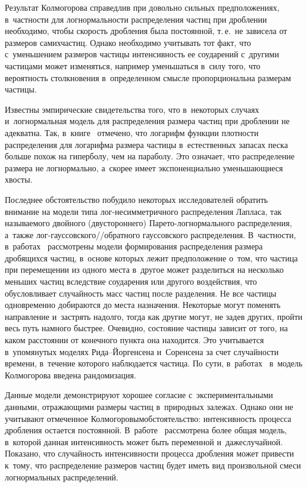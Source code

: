 \begin{multicols}{2}
 Результат Колмогорова справедлив при довольно сильных 
предположениях, в~част\-ности для логнормальности распределения час\-тиц при 
дроблении необходимо, чтобы ско\-рость дроб\-ле\-ния была постоянной, т.\,е.\ 
не зависела от размеров самих\linebreak час\-тиц. Однако необходимо учитывать тот 
факт, что с~уменьшением размеров час\-ти\-цы интенсивность ее соударений 
с~другими частицами может изменяться, например уменьшаться в~силу того, 
что вероятность столкновения в~определенном смыс\-ле пропорциональна 
размерам час\-тицы. 
{

}

Известны эмпирические свидетельства того, что 
в~некоторых случаях и~логнормальная модель для распределения размера 
частиц при дроблении не адекватна. Так, в~книге~\cite{Bagnold1954} 
отмечено, что логарифм функции плот\-ности распределения для логарифма 
размера частицы в~естественных запасах песка больше похож на гиперболу, 
чем на параболу. Это означает, что распределение размера не логнормально, 
а~скорее имеет экспоненциально уменьшающиеся хвосты.

Последнее обстоятельство побудило некоторых исследователей обратить 
внимание на модели типа  
лог-не\-сим\-мет\-рич\-но\-го распределения Лапласа, так называемого 
двойного (двустороннего)  
Па\-ре\-то-лог\-нор\-маль\-но\-го распределения, а~также 
лог-гаус\-сов\-ско\-го/\!/об\-рат\-но\-го гауссовского распределения. В~част\-ности, 
в~работах~\cite{ReedJorgensen2003,Sorensen2006} рассмотрены модели 
формирования распределения размера дробящихся частиц, в~основе которых 
лежит предположение о~том, что час\-ти\-ца при перемещении из одного места 
в~другое может разделиться на несколько меньших частиц вследствие 
соударения или другого воздействия, что обусловливает случайность масс 
частиц после разделения. Не все частицы одновременно добираются до места 
назначения. Некоторые могут поменять направление и~застрять надолго, 
тогда как другие могут, не задев других, пройти весь путь намного 
быстрее. Очевидно, состояние частицы зависит от того, на каком расстоянии 
от конечного пункта она находится. Это учитывается в~упомянутых моделях 
Ри\-да--Йор\-ген\-се\-на и~Соренсена за счет случайности времени, 
в~течение которого наблюдается частица. По сути, 
в~работах~\cite{ReedJorgensen2003,Sorensen2006} в~модель Колмогорова 
введена рандомизация.

Данные модели демонстрируют хорошее согласие с~экспериментальными 
данными, отражающими размеры частиц в~природных залежах. Однако они не 
учитывают отмеченное Колмогоровым\linebreak обстоятельство: интенсивность процесса 
дробления остается постоянной. В~работе~\cite{Korolev2009} рас\-смот\-рена 
более общая модель, в~которой данная интенсивность может быть переменной 
и~даже\linebreak случайной. Показано, что случайность интенсивности процесса 
дробления может привести к~тому, что распределение размеров частиц будет 
иметь вид произвольной смеси логнормальных рас\-пре\-де\-ле\-ний.
{ %

}
\end{multicols}
